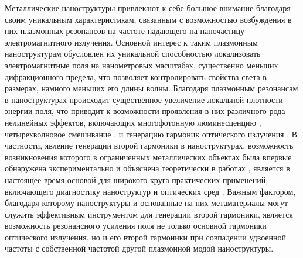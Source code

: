 \documentclass[12pt, a4paper]{article}
\begin{document}
Металлические наноструктуры привлекают к себе большое внимание благодаря своим уникальным характеристикам, связанным с возможностью возбуждения в них плазмонных резонансов на частоте падающего на наночастицу электромагнитного излучения.
Основной интерес к таким плазмонным наноструктурам обусловлен их уникальной способностью локализовать электромагнитные поля на нанометровых масштабах, существенно меньших дифракционного предела, что позволяет контролировать свойства света в размерах, намного меньших его длины волны\cite{Mai2007, Gram2010}.
Благодаря плазмонным резонансам в наноструктурах происходит существенное увеличение локальной плотности энергии поля, что приводит к возможности проявления в них различного рода нелинейных эффектов, включающих многофотонную люминесценцию \cite{Cas2011,biagioni2012,chen2021, ko2011}, четырехволновое смешивание \cite{danckwerts2007, harutyunyan2012, paspalakis2014, singh2016}, и генерацию гармоник оптического излучения \cite{drobyh2020, smirnova2014, TorresTorres2010}.
В частности, явление генерации второй гармоники в наноструктурах, возможность возникновения которого в ограниченных металлических объектах была впервые обнаружена экспериментально и объяснена теоретически в работах \cite{franken1961, Bloembergen1962}, является в настоящее время основой для широкого круга практических применений, включающего диагностику наноструктур \cite{butet2015} и оптических сред \cite{Butet2012}.
Важным фактором, благодаря которому наноструктуры и основанные на них метаматериалы могут служить эффективным инструментом для генерации второй гармоники, является возможность резонансного усиления поля не только основной гармоники оптического излучения, но и его второй гармоники при совпадении удвоенной частоты с собственной частотой другой плазмонной модой наноструктуры. 
\end{document}
